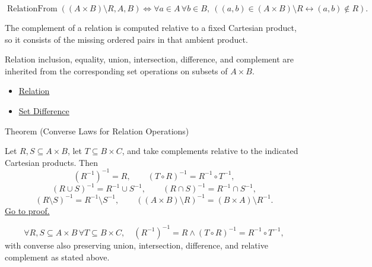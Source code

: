 \begin{remark*}
\[
  \operatorname{RelationFrom}((A\times B)\setminus R,A,B)
  \iff
  \forall a\in A\,\forall b\in B,\ ((a,b)\in (A\times B)\setminus R \leftrightarrow (a,b)\notin R).
\]
\end{remark*}

\begin{remark*}[Interpretation]
The complement of a relation is computed relative to a fixed Cartesian
product, so it consists of the missing ordered pairs in that ambient product.
\end{remark*}

\begin{remark*}[Exposition]
Relation inclusion, equality, union, intersection, difference, and complement
are inherited from the corresponding set operations on subsets of $A\times B$.
\end{remark*}

\begin{dependencies}
\begin{itemize}
  \item \hyperref[def:relation]{Relation}
  \item \hyperref[def:set-difference]{Set Difference}
\end{itemize}
\end{dependencies}

\begin{theorembox}{Theorem (Converse Laws for Relation Operations)}
\begin{theorem}\label{thm:relation-converse-laws}
Let $R,S\subseteq A\times B$, let $T\subseteq B\times C$, and take complements
relative to the indicated Cartesian products. Then
\[
(R^{-1})^{-1}=R,\qquad
(T\circ R)^{-1}=R^{-1}\circ T^{-1},
\]
\[
(R\cup S)^{-1}=R^{-1}\cup S^{-1},\qquad
(R\cap S)^{-1}=R^{-1}\cap S^{-1},
\]
\[
(R\setminus S)^{-1}=R^{-1}\setminus S^{-1},\qquad
((A\times B)\setminus R)^{-1}=(B\times A)\setminus R^{-1}.
\]
\hyperref[prf:relation-converse-laws]{Go to proof.}
\end{theorem}
\end{theorembox}

\begin{remark*}
\[
  \forall R,S\subseteq A\times B\,\forall T\subseteq B\times C,
  \quad
  (R^{-1})^{-1}=R
  \wedge
  (T\circ R)^{-1}=R^{-1}\circ T^{-1},
\]
with converse also preserving union, intersection, difference, and relative
complement as stated above.
\end{remark*}

